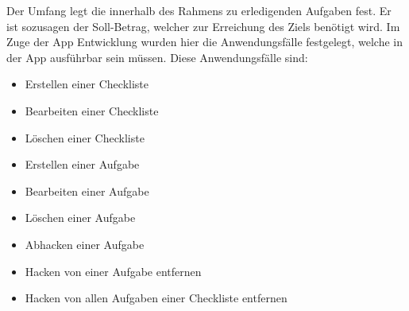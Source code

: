 Der Umfang legt die innerhalb des Rahmens zu erledigenden Aufgaben fest. Er ist sozusagen der Soll-Betrag, welcher zur Erreichung des Ziels benötigt wird. Im Zuge der App Entwicklung wurden hier die Anwendungsfälle festgelegt, welche in der App ausführbar sein müssen. Diese Anwendungsfälle sind:

\begin{itemize}
	\item Erstellen einer Checkliste
	\item Bearbeiten einer Checkliste
	\item Löschen einer Checkliste
	\item Erstellen einer Aufgabe
	\item Bearbeiten einer Aufgabe
	\item Löschen einer Aufgabe
	\item Abhacken einer Aufgabe
	\item Hacken von einer Aufgabe entfernen
	\item Hacken von allen Aufgaben einer Checkliste entfernen
\end{itemize}

